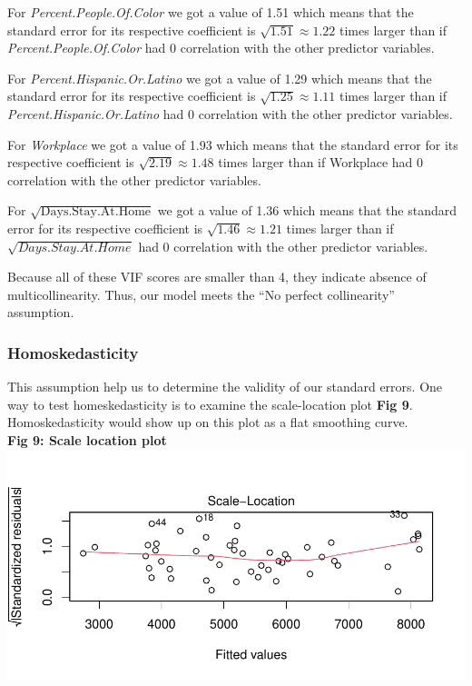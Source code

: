 \documentclass[
]{article}
\begin{document}
For \emph{Percent.People.Of.Color} we got a value of 1.51 which means
that the standard error for its respective coefficient is
\(\sqrt {1.51}\approx 1.22\) times larger than if
\emph{Percent.People.Of.Color} had 0 correlation with the other
predictor variables.

For \emph{Percent.Hispanic.Or.Latino} we got a value of 1.29 which means
that the standard error for its respective coefficient is
\(\sqrt {1.25} \approx 1.11\) times larger than if
\emph{Percent.Hispanic.Or.Latino} had 0 correlation with the other
predictor variables.

For \emph{Workplace} we got a value of 1.93 which means that the
standard error for its respective coefficient is
\(\sqrt {2.19} \approx 1.48\) times larger than if Workplace had 0
correlation with the other predictor variables.

For \(\sqrt{\text{Days.Stay.At.Home}}\) we got a value of 1.36 which
means that the standard error for its respective coefficient is
\(\sqrt {1.46} \approx 1.21\) times larger than if
\(\sqrt{Days.Stay.At.Home}\) had 0 correlation with the other predictor
variables.

Because all of these VIF scores are smaller than 4, they indicate
absence of multicollinearity. Thus, our model meets the ``No perfect
collinearity'' assumption.

\hypertarget{homoskedasticity}{%
\subsubsection{Homoskedasticity}\label{homoskedasticity}}

This assumption help us to determine the validity of our standard
errors. One way to test homeskedasticity is to examine the
scale-location plot \textbf{Fig 9}. Homoskedasticity would show up on
this plot as a flat smoothing curve.\\

\textbf{Fig 9: Scale location plot}\\
\includegraphics{Final_Report_files/figure-latex/hms-1.pdf}
\end{document}

